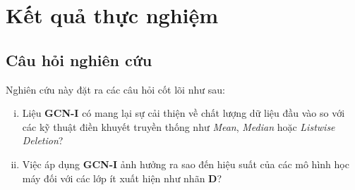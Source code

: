 \section{Kết quả thực nghiệm}
\subsection{Câu hỏi nghiên cứu}
Nghiên cứu này đặt ra các câu hỏi cốt lõi như sau:

\begin{enumerate}[(i)]
\item Liệu \textbf{GCN-I} có mang lại sự cải thiện về chất lượng dữ liệu đầu vào so với các kỹ thuật điền khuyết truyền thống như \textit{Mean}, \textit{Median} hoặc \textit{Listwise Deletion}?
\item Việc áp dụng \textbf{GCN-I} ảnh hưởng ra sao đến hiệu suất của các mô hình học máy đối với các lớp ít xuất hiện như nhãn \textbf{D}?
\end{enumerate}
